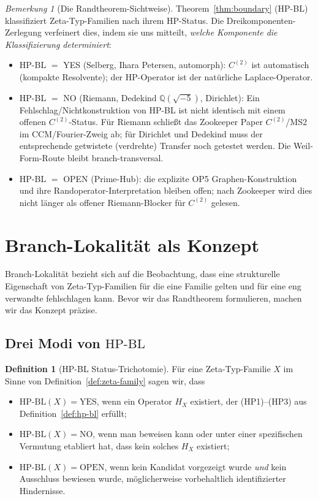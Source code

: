 \documentclass[11pt]{article}
\theoremstyle{definition}
\newtheorem{definition}[theorem]{Definition}
\theoremstyle{remark}
\newtheorem{remark}[theorem]{Bemerkung}
\newcommand{\HBL}{\mathrm{HP\text{-}BL}}
\begin{document}
\begin{remark}[Die Randtheorem-Sichtweise]
\label{rem:boundary-three-component}
Theorem~\ref{thm:boundary} (HP-BL) klassifiziert Zeta-Typ-Familien
nach ihrem HP-Status. Die Dreikomponenten-Zerlegung verfeinert dies,
indem sie uns mitteilt, \emph{welche Komponente die Klassifizierung determiniert}:
\begin{itemize}
\item HP-BL $=$ YES (Selberg, Ihara Petersen, automorph):
$C^{(2)}$ ist automatisch (kompakte Resolvente); der HP-Operator ist
der natürliche Laplace-Operator.
\item HP-BL $=$ NO (Riemann, Dedekind $\mathbb{Q}(\sqrt{-5})$, Dirichlet):
Ein Fehlschlag/Nichtkonstruktion von HP-BL ist nicht identisch mit einem
offenen $C^{(2)}$-Status. Für Riemann schließt das Zookeeper Paper
$C^{(2)}$/MS2 im CCM/Fourier-Zweig ab; für Dirichlet und Dedekind muss der
entsprechende getwistete (verdrehte) Transfer noch getestet werden. Die Weil-Form-Route
bleibt branch-transversal.
\item HP-BL $=$ OPEN (Prime-Hub): die explizite OP5 Graphen-Konstruktion
und ihre Randoperator-Interpretation bleiben offen; nach Zookeeper wird dies
nicht länger als offener Riemann-Blocker für $C^{(2)}$ gelesen.
\end{itemize}
\end{remark}

\section{Branch-Lokalität als Konzept}
\label{sec:locality}

Branch-Lokalität bezieht sich auf die Beobachtung, dass eine strukturelle
Eigenschaft von Zeta-Typ-Familien für die eine Familie gelten und für eine eng
verwandte fehlschlagen kann. Bevor wir das Randtheorem formulieren, machen
wir das Konzept präzise.

\subsection{Drei Modi von \texorpdfstring{$\HBL$}{HP-BL}}

\begin{definition}[HP-BL Status-Trichotomie]\label{def:hpbl-status}
Für eine Zeta-Typ-Familie $X$ im Sinne von Definition~\ref{def:zeta-family}
sagen wir, dass
\begin{itemize}
\item $\HBL(X) = \mathrm{YES}$, wenn ein Operator $H_X$ existiert, der
  (HP1)--(HP3) aus Definition~\ref{def:hp-bl} erfüllt;
\item $\HBL(X) = \mathrm{NO}$, wenn man beweisen kann oder unter einer
  spezifischen Vermutung etabliert hat, dass kein solches $H_X$ existiert;
\item $\HBL(X) = \mathrm{OPEN}$, wenn kein Kandidat vorgezeigt wurde
  \emph{und} kein Ausschluss bewiesen wurde, möglicherweise vorbehaltlich
  identifizierter Hindernisse.
\end{itemize}
\end{definition}
\end{document}
